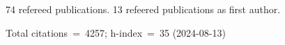 74 refereed publications. 13 refeered publications as first author.

Total citations~=~4257; h-index~=~35 (2024-08-13)
